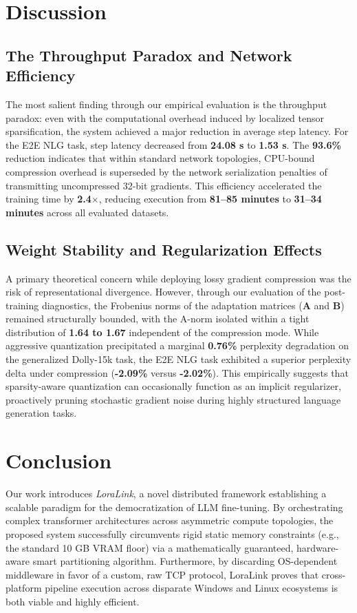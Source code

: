 \documentclass{ieeeaccess}
\begin{document}
\section{Discussion}

\subsection{The Throughput Paradox and Network Efficiency}
The most salient finding through our empirical evaluation is the throughput paradox: even with the computational overhead induced by localized tensor sparsification, the system achieved a major reduction in average step latency. For the E2E NLG task, step latency decreased from \textbf{24.08 s} to \textbf{1.53 s}. The \textbf{93.6\%} reduction indicates that within standard network topologies, CPU-bound compression overhead is superseded by the network serialization penalties of transmitting uncompressed 32-bit gradients. This efficiency accelerated the training time by \textbf{2.4$\times$}, reducing execution from \textbf{81--85 minutes} to \textbf{31--34 minutes} across all evaluated datasets.

\subsection{Weight Stability and Regularization Effects}
A primary theoretical concern while deploying lossy gradient compression was the risk of representational divergence. However, through our evaluation of the post-training diagnostics, the Frobenius norms of the adaptation matrices (\textbf{A} and \textbf{B}) remained structurally bounded, with the A-norm isolated within a tight distribution of \textbf{1.64 to 1.67} independent of the compression mode. While aggressive quantization precipitated a marginal \textbf{0.76\%} perplexity degradation on the generalized Dolly-15k task, the E2E NLG task exhibited a superior perplexity delta under compression (\textbf{-2.09\%} versus \textbf{-2.02\%}). This empirically suggests that sparsity-aware quantization can occasionally function as an implicit regularizer, proactively pruning stochastic gradient noise during highly structured language generation tasks.

\section{Conclusion}

Our work introduces \textit{LoraLink}, a novel distributed framework establishing a scalable paradigm for the democratization of LLM fine-tuning. By orchestrating complex transformer architectures across asymmetric compute topologies, the proposed system successfully circumvents rigid static memory constraints (e.g., the standard 10 GB VRAM floor) via a mathematically guaranteed, hardware-aware smart partitioning algorithm. Furthermore, by discarding OS-dependent middleware in favor of a custom, raw TCP protocol, LoraLink proves that cross-platform pipeline execution across disparate Windows and Linux ecosystems is both viable and highly efficient.
\end{document}
